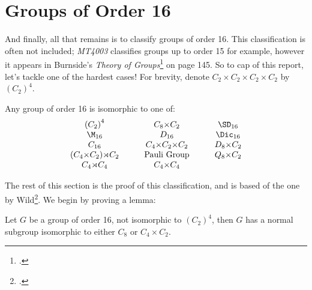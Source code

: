 \section{Groups of Order 16}
And finally, all that remains is to classify groups of order 16.
This classification is often not included; \textit{MT4003} classifies groups up to order 15 for example, however it
appears in Burnside's \textit{Theory of Groups}\footcite[p145]{burnside1911} on page 145.
So to cap of this report, let's tackle one of the hardest cases!
For brevity, denote \(C_2 {\times} C_2 {\times} C_2 {\times} C_2\) by \({(C_2)}^4\).


\begin{theorem}
    Any group of order 16 is isomorphic to one of:
    \begin{displaymath}
    \begin{array}{c@{\hskip 3em}c@{\hskip 3em}c}
        {(C_2)}^4 & C_8 {\times} C_2 & \SD_{16} \\
        \M_{16} & D_{16} & \Dic_{16} \\
        C_{16} & C_4 {\times} C_2 {\times} C_2 & D_8 {\times} C_2 \\
        (C_4 {\times} C_2) {\rtimes} C_2 & \text{Pauli Group} & Q_8 {\times} C_2 \\
        C_4 {\rtimes} C_4 & C_4 {\times} C_4 & \\
    \end{array}
    \end{displaymath}
\end{theorem}

The rest of this section is the proof of this classification, and is based of the one by Wild\footcite{order16}.
We begin by proving a lemma:

\begin{lemma}\label{lem:order_16_subgp}
    \raggedright
    Let \(G\) be a group of order 16, not isomorphic to \({(C_2)}^4\), then \(G\) has a
    normal subgroup isomorphic to either \(C_8\) or \(C_4 \times C_2\).
\end{lemma}

